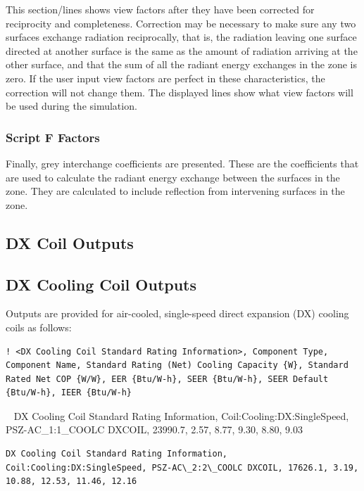 This section/lines shows view factors after they have been corrected for reciprocity and completeness. Correction may be necessary to make sure any two surfaces exchange radiation reciprocally, that is, the radiation leaving one surface directed at another surface is the same as the amount of radiation arriving at the other surface, and that the sum of all the radiant energy exchanges in the zone is zero. If the user input view factors are perfect in these characteristics, the correction will not change them. The displayed lines show what view factors will be used during the simulation.

\subsubsection{Script F Factors}\label{script-f-factors}

Finally, grey interchange coefficients are presented. These are the coefficients that are used to calculate the radiant energy exchange between the surfaces in the zone. They are calculated to include reflection from intervening surfaces in the zone.

\subsection{DX Coil Outputs}\label{dx-coil-outputs}

\subsection{DX Cooling Coil Outputs}\label{dx-cooling-coil-outputs}

Outputs are provided for air-cooled, single-speed direct expansion (DX) cooling coils as follows:

\begin{lstlisting}
! <DX Cooling Coil Standard Rating Information>, Component Type, Component Name, Standard Rating (Net) Cooling Capacity {W}, Standard Rated Net COP {W/W}, EER {Btu/W-h}, SEER {Btu/W-h}, SEER Default {Btu/W-h}, IEER {Btu/W-h}
\end{lstlisting}
~ DX Cooling Coil Standard Rating Information, Coil:Cooling:DX:SingleSpeed, PSZ-AC\_1:1\_COOLC DXCOIL, 23990.7, 2.57, 8.77, 9.30, 8.80, 9.03
\begin{lstlisting}
DX Cooling Coil Standard Rating Information, Coil:Cooling:DX:SingleSpeed, PSZ-AC\_2:2\_COOLC DXCOIL, 17626.1, 3.19, 10.88, 12.53, 11.46, 12.16
\end{lstlisting}

